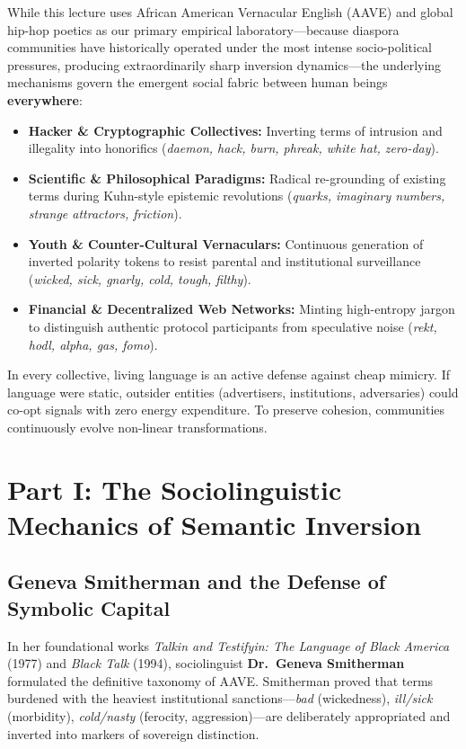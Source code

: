 \documentclass[11pt,letterpaper]{article}
\begin{document}
While this lecture uses African American Vernacular English (AAVE) and global hip-hop poetics as our primary empirical laboratory---because diaspora communities have historically operated under the most intense socio-political pressures, producing extraordinarily sharp inversion dynamics---the underlying mechanisms govern the emergent social fabric between human beings \textbf{everywhere}:
\begin{itemize}[itemsep=2pt, topsep=2pt]
    \item \textbf{Hacker \& Cryptographic Collectives:} Inverting terms of intrusion and illegality into honorifics (\textit{daemon, hack, burn, phreak, white hat, zero-day}).
    \item \textbf{Scientific \& Philosophical Paradigms:} Radical re-grounding of existing terms during Kuhn-style epistemic revolutions (\textit{quarks, imaginary numbers, strange attractors, friction}).
    \item \textbf{Youth \& Counter-Cultural Vernaculars:} Continuous generation of inverted polarity tokens to resist parental and institutional surveillance (\textit{wicked, sick, gnarly, cold, tough, filthy}).
    \item \textbf{Financial \& Decentralized Web Networks:} Minting high-entropy jargon to distinguish authentic protocol participants from speculative noise (\textit{rekt, hodl, alpha, gas, fomo}).
\end{itemize}
In every collective, living language is an active defense against cheap mimicry. If language were static, outsider entities (advertisers, institutions, adversaries) could co-opt signals with zero energy expenditure. To preserve cohesion, communities continuously evolve non-linear transformations.

\section{Part I: The Sociolinguistic Mechanics of Semantic Inversion}

\subsection{Geneva Smitherman and the Defense of Symbolic Capital}
In her foundational works \textit{Talkin and Testifyin: The Language of Black America} (1977) and \textit{Black Talk} (1994), sociolinguist \textbf{Dr.~Geneva Smitherman} formulated the definitive taxonomy of AAVE. Smitherman proved that terms burdened with the heaviest institutional sanctions---\textit{bad} (wickedness), \textit{ill/sick} (morbidity), \textit{cold/nasty} (ferocity, aggression)---are deliberately appropriated and inverted into markers of sovereign distinction.
\end{document}
